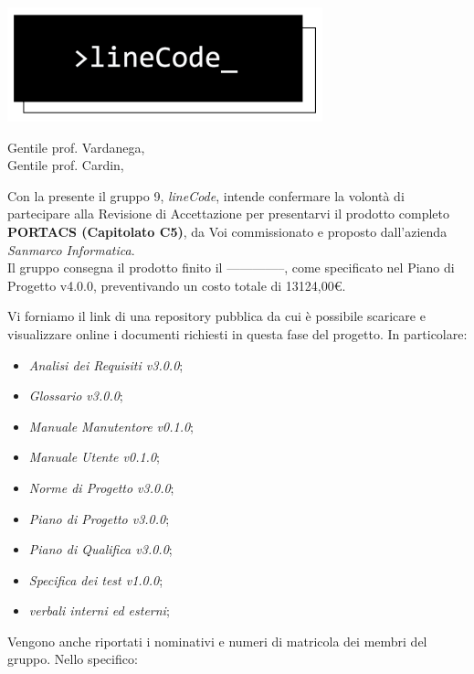 \documentclass[12pt]{letter}
\date{22 agosto 2021}
\begin{document}
\begin{letter}{ }

\includegraphics[scale=0.5]{../../commons/res/lclong.png}

\opening{Gentile prof. Vardanega,\\ Gentile prof. Cardin, }

Con la presente il gruppo 9, \textit{lineCode}, intende confermare la volontà di partecipare alla Revisione di Accettazione per presentarvi il prodotto completo \textbf{PORTACS (Capitolato C5)}, da Voi commissionato e proposto dall'azienda \textit{Sanmarco Informatica}. \\
Il gruppo consegna il prodotto finito il --------------, come specificato nel Piano di Progetto v4.0.0, preventivando un costo totale di 13124,00\euro.


Vi forniamo il link di una repository pubblica da cui è possibile scaricare e visualizzare online i documenti richiesti in questa fase del progetto.
In particolare:

\begin{itemize}
	\item \textit{Analisi dei Requisiti v3.0.0};
	\item \textit{Glossario v3.0.0};
	\item \textit{Manuale Manutentore v0.1.0};
	\item \textit{Manuale Utente v0.1.0};
	\item \textit{Norme di Progetto v3.0.0};
	\item \textit{Piano di Progetto v3.0.0};
	\item \textit{Piano di Qualifica v3.0.0};
	\item \textit{Specifica dei test v1.0.0};	
	\item \textit{verbali interni ed esterni};

\end{itemize}

\newpage

Vengono anche riportati i nominativi e numeri di matricola dei membri del gruppo. Nello specifico:


\end{letter}
\end{document}
